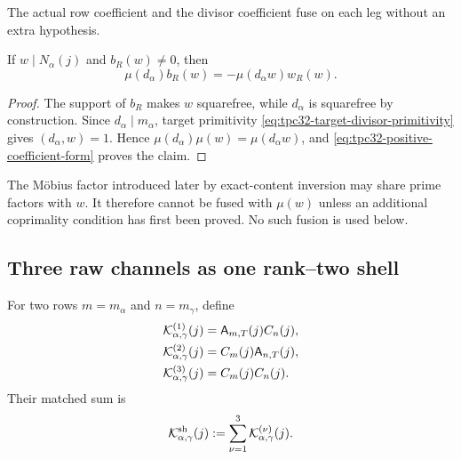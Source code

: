 The actual row coefficient and the divisor coefficient fuse on each
leg without an extra hypothesis.

\begin{lemma}
\label{lem:tpc32-sign-fusion}
If \(w\mid N_\alpha(j)\) and \(b_R(w)\ne0\), then
\begin{equation}
 \boxed{
 \mu(d_\alpha)b_R(w)
 =-\mu(d_\alpha w)w_R(w).}
 \label{eq:tpc32-sign-fusion}
\end{equation}
\end{lemma}

\begin{proof}
The support of \(b_R\) makes \(w\) squarefree, while
\(d_\alpha\) is squarefree by construction.  Since
\(d_\alpha\mid m_\alpha\), target primitivity
\eqref{eq:tpc32-target-divisor-primitivity} gives
\((d_\alpha,w)=1\).  Hence
\(\mu(d_\alpha)\mu(w)=\mu(d_\alpha w)\), and
\eqref{eq:tpc32-positive-coefficient-form} proves the claim.
\end{proof}

\begin{remark}
The M\"obius factor introduced later by exact-content inversion may
share prime factors with \(w\).  It therefore cannot be fused with
\(\mu(w)\) unless an additional coprimality condition has first been
proved.  No such fusion is used below.
\end{remark}

\subsection{Three raw channels as one rank--two shell}

For two rows \(m=m_\alpha\) and \(n=m_\gamma\), define
\begin{align}
 \mathcal K^{(1)}_{\alpha,\gamma}(j)
 &=\mathsf A_{m,T}(j)C_n(j),
 \notag\\
 \mathcal K^{(2)}_{\alpha,\gamma}(j)
 &=C_m(j)\mathsf A_{n,T}(j),
 \label{eq:tpc32-three-raw-kernels}\\
 \mathcal K^{(3)}_{\alpha,\gamma}(j)
 &=C_m(j)C_n(j).
 \notag
\end{align}
Their matched sum is
\begin{equation}
 \mathcal K^{\mathrm{sh}}_{\alpha,\gamma}(j)
 :=\sum_{\nu=1}^3\mathcal K^{(\nu)}_{\alpha,\gamma}(j).
 \label{eq:tpc32-matched-shell-definition}
\end{equation}

